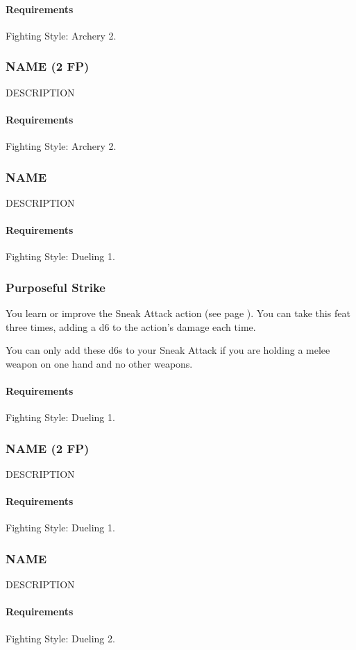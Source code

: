     \paragraph{Requirements} Fighting Style: Archery 2.
\subsubsection{NAME (2 FP)} \label{feat::name}
    DESCRIPTION
    \paragraph{Requirements} Fighting Style: Archery 2.
\subsubsection{NAME} \label{feat::name}
    DESCRIPTION
    \paragraph{Requirements} Fighting Style: Dueling 1.
\subsubsection{Purposeful Strike} \label{feat::purposefulstrike}
    You learn or improve the Sneak Attack action (see page \pageref{act:sneakattack}).
    You can take this feat three times, adding a d6 to the action's damage each time.

    You can only add these d6s to your Sneak Attack if you are holding a melee weapon on one hand and no other weapons.
    \paragraph{Requirements} Fighting Style: Dueling 1.
\subsubsection{NAME (2 FP)} \label{feat::name}
    DESCRIPTION
    \paragraph{Requirements} Fighting Style: Dueling 1.
\subsubsection{NAME} \label{feat::name}
    DESCRIPTION
    \paragraph{Requirements} Fighting Style: Dueling 2.
